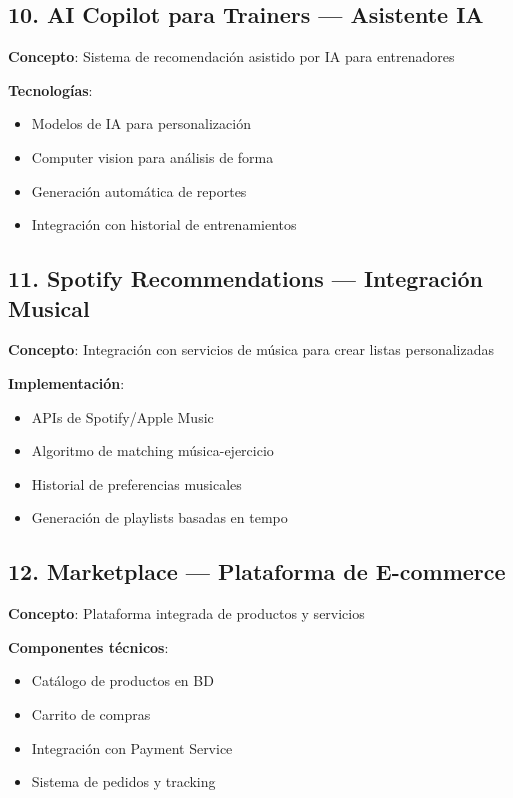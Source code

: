 \documentclass[11pt,a4paper]{article}
\begin{document}
\begin{itemize}
\subsection{10. AI Copilot para Trainers — Asistente IA}

\begin{definicion}
\textbf{Concepto}: Sistema de recomendación asistido por IA para entrenadores
\end{definicion}

\textbf{Tecnologías}:
\begin{itemize}
    \item Modelos de IA para personalización
    \item Computer vision para análisis de forma
    \item Generación automática de reportes
    \item Integración con historial de entrenamientos
\end{itemize}

\subsection{11. Spotify Recommendations — Integración Musical}

\begin{definicion}
\textbf{Concepto}: Integración con servicios de música para crear listas personalizadas
\end{definicion}

\textbf{Implementación}:
\begin{itemize}
    \item APIs de Spotify/Apple Music
    \item Algoritmo de matching música-ejercicio
    \item Historial de preferencias musicales
    \item Generación de playlists basadas en tempo
\end{itemize}

\subsection{12. Marketplace — Plataforma de E-commerce}

\begin{definicion}
\textbf{Concepto}: Plataforma integrada de productos y servicios
\end{definicion}

\textbf{Componentes técnicos}:
\begin{itemize}
    \item Catálogo de productos en BD
    \item Carrito de compras
    \item Integración con Payment Service
    \item Sistema de pedidos y tracking
\end{itemize}


\end{itemize}
\end{document}
